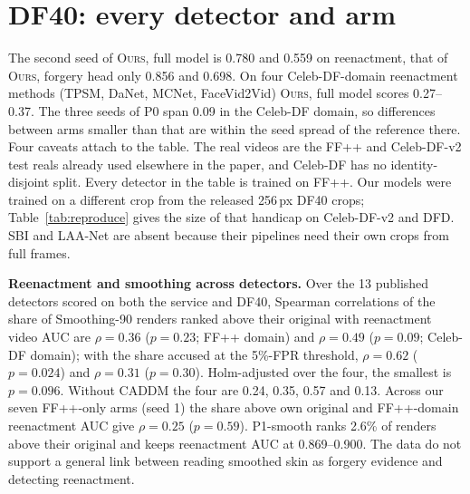 \documentclass[10pt]{article}
\newcommand{\oursB}{\textsc{Ours}, forgery head only}
\newcommand{\oursF}{\textsc{Ours}, full model}
\begin{document}
\section{DF40: every detector and arm}
\label{sec:df40}
\begin{table}[H]
\centering
\caption{DF40 held-out, untreated. Video AUC (mean frame score per video), mean over methods, with 95\% bootstrap intervals over
videos. Real videos are the FF++ and Celeb-DF-v2 test reals; the 718 MobileSwap videos from FF++ training identities were removed;
140 fake videos per method in the Celeb-DF domain. FS: nine face-swap methods; FR: twelve reenactment methods. CADDM and the rows
from P0 downwards were scored after the first table had been read. Paired blocks: \oursB{} minus each detector with the video and
the identity interval of the identity-bootstrap script (Sec.~\ref{sec:identity}; Celeb-DF domain: video only, no identity labels),
and \oursF{} minus each detector with the video interval of the earlier version.}
\label{tab:v4df40full}
\scriptsize
\begin{adjustbox}{max width=\linewidth}\end{adjustbox}
\end{table}
The second seed of \oursF{} is 0.780 and 0.559 on reenactment, that of \oursB{} 0.856 and 0.698. On four Celeb-DF-domain
reenactment methods (TPSM, DaNet, MCNet, FaceVid2Vid) \oursF{} scores 0.27--0.37. The three seeds of P0 span 0.09 in the Celeb-DF domain, so differences between arms smaller
than that are within the seed spread of the reference there. Four caveats attach to the table. The real videos are the FF++ and
Celeb-DF-v2 test reals already used elsewhere in the paper, and Celeb-DF has no identity-disjoint split. Every detector in the table
is trained on FF++. Our models were trained on a different crop from the released 256\,px DF40 crops; Table~\ref{tab:reproduce}
gives the size of that handicap on Celeb-DF-v2 and DFD. SBI and LAA-Net are absent because their pipelines need their own crops from
full frames.

\textbf{Reenactment and smoothing across detectors.} Over the 13 published detectors scored on both the service and DF40, Spearman
correlations of the share of Smoothing-90 renders ranked above their original with reenactment video AUC are $\rho=0.36$
($p=0.23$; FF++ domain) and $\rho=0.49$ ($p=0.09$; Celeb-DF domain); with the share accused at the 5\%-FPR threshold, $\rho=0.62$
($p=0.024$) and $\rho=0.31$ ($p=0.30$). Holm-adjusted over the four, the smallest is $p=0.096$. Without CADDM the four are 0.24,
0.35, 0.57 and 0.13. Across our seven FF++-only arms (seed 1) the share above own original and FF++-domain reenactment AUC give
$\rho=0.25$ ($p=0.59$). P1-smooth ranks 2.6\% of renders above their original and keeps reenactment AUC at 0.869--0.900. The data
do not support a general link between reading smoothed skin as forgery evidence and detecting reenactment.
\end{document}
